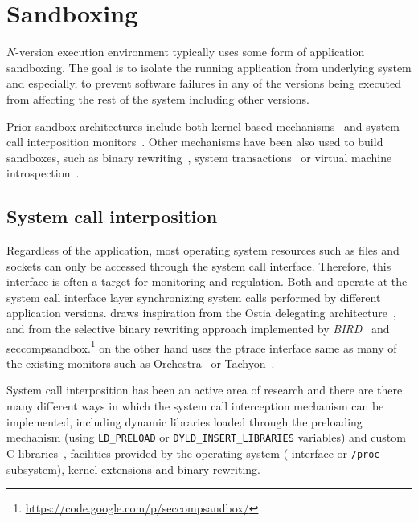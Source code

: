 \section{Sandboxing}
\label{related:sandboxing}

$N$-version execution environment typically uses some form of application
sandboxing. The goal is to isolate the running application from underlying
system and especially, to prevent software failures in any of the versions
being executed from affecting the rest of the system including other versions.

Prior sandbox architectures include both kernel-based
mechanisms~\cite{tron,remus,subdomain,cots-hardening} and system call
interposition monitors~\cite{wily-hacker,mapbox,jain1999,provos2002,mbox}.
Other mechanisms have been also used to build sandboxes, such as binary
rewriting~\cite{vx32,true:sp12}, system transactions~\cite{txbox} or virtual
machine introspection~\cite{garfinkel:vmi}.

\subsection{System call interposition}
\label{related:syscalls}

Regardless of the application, most operating system resources such as files
and sockets can only be accessed through the system call interface.  Therefore,
this interface is often a target for monitoring and regulation. Both \varan and
\mx operate at the system call interface layer synchronizing system calls
performed by different application versions. \varan draws inspiration from the
Ostia delegating architecture~\cite{ostia}, and from the selective binary
rewriting approach implemented by \emph{BIRD}~\cite{bird} and
\textsf{seccompsandbox}.\footnote{\url{https://code.google.com/p/seccompsandbox/}}
\mx on the other hand uses the \textsf{ptrace} interface same as many of the
existing monitors such as Orchestra~\cite{orchestra09} or
Tachyon~\cite{tachyon12}.

System call interposition has been an active area of research and there are
there many different ways in which the system call interception mechanism can
be implemented, including dynamic libraries loaded through the preloading
mechanism (\ie using \lstinline`LD_PRELOAD` or
\lstinline`DYLD_INSERT_LIBRARIES` variables) and custom C
libraries~\cite{plash}, facilities provided by the operating system (\ie
\ptrace interface or \lstinline`/proc` subsystem), kernel extensions and binary
rewriting.

